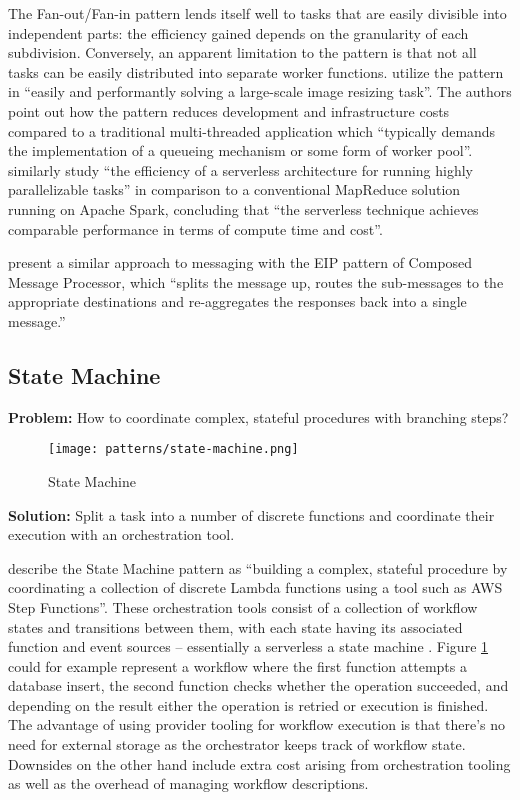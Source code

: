 The Fan-out/Fan-in pattern lends itself well to tasks that are easily divisible into independent parts: the efficiency gained depends on the granularity of each subdivision. Conversely, an apparent limitation to the pattern is that not all tasks can be easily distributed into separate worker functions. \textcite{mcgrath16cloudEventParadigms} utilize the pattern in ``easily and performantly solving a large-scale image resizing task''. The authors point out how the pattern reduces development and infrastructure costs compared to a traditional multi-threaded application which ``typically demands the implementation of a queueing mechanism or some form of worker pool''. \textcite{lavoie19efficiency} similarly study ``the efficiency of a serverless architecture for running highly parallelizable tasks'' in comparison to a conventional MapReduce solution running on Apache Spark, concluding that ``the serverless technique achieves comparable performance in terms of compute time and cost''.

\textcite{hohpe2004enterprise} present a similar approach to messaging with the EIP pattern of Composed Message Processor, which ``splits the message up, routes the sub-messages to the appropriate destinations and re-aggregates the responses back into a single message.''

\subsection{State Machine} \label{subsec:stateMachine}

\textbf{Problem:} How to coordinate complex, stateful procedures with branching steps?

\begin{figure}[h]
  \centering
  \texttt{[image: patterns/state-machine.png]}
  \caption{State Machine}
  \label{fig:patternStateMachine}
\end{figure}

\textbf{Solution:} Split a task into a number of discrete functions and coordinate their execution with an orchestration tool.

\textcite{hong18securingviaserverlesspatterns} describe the State Machine pattern as ``building a complex, stateful procedure by coordinating a collection of discrete Lambda functions using a tool such as AWS Step Functions''. These orchestration tools consist of a collection of workflow states and transitions between them, with each state having its associated function and event sources -- essentially a serverless a state machine \parencite{cncf18serverlessWG}. Figure \ref{fig:patternStateMachine} could for example represent a workflow where the first function attempts a database insert, the second function checks whether the operation succeeded, and depending on the result either the operation is retried or execution is finished. The advantage of using provider tooling for workflow execution is that there's no need for external storage as the orchestrator keeps track of workflow state. Downsides on the other hand include extra cost arising from orchestration tooling as well as the overhead of managing workflow descriptions.

